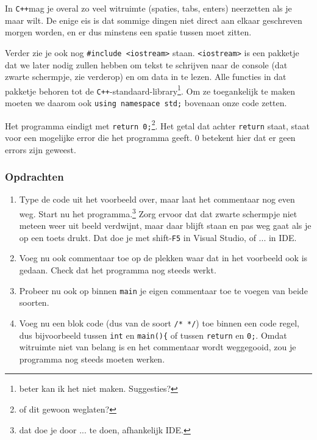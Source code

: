 \documentclass[12pt,a4paper]{article}
\newcommand{\icode}{\lstinline}
\newcommand{\mono}{\texttt}
\newcommand{\cpp}{\mono{C++}}
\begin{document}
In \cpp  mag je overal zo veel witruimte (spaties, tabs, enters) neerzetten als je maar wilt. De enige eis is dat sommige dingen niet direct aan elkaar geschreven morgen worden, en er dus minstens een spatie tussen moet zitten.


Verder zie je ook nog \icode{#include <iostream>} staan. \icode{<iostream>} is een pakketje dat we later nodig zullen hebben om tekst te schrijven naar de console (dat zwarte schermpje, zie verderop) en om data in te lezen. Alle functies in dat pakketje behoren tot de \cpp-standaard-library\footnote{beter kan ik het niet maken. Suggesties?}. Om ze toegankelijk te maken moeten we daarom ook \icode{using namespace std;} bovenaan onze code zetten.


Het programma eindigt met \icode{return 0;}\footnote{of dit gewoon weglaten?}. Het getal dat achter \icode{return} staat, staat voor een mogelijke error die het programma geeft. 0 betekent hier dat er geen errors zijn geweest.
\subsubsection{Opdrachten}
\begin{enumerate}
	\item
		Type de code uit het voorbeeld over, maar laat het commentaar nog even weg. Start nu het programma.\footnote{dat doe je door ... te doen, afhankelijk IDE.} Zorg ervoor dat dat zwarte schermpje niet meteen weer uit beeld verdwijnt, maar daar blijft staan en pas weg gaat als je op een toets drukt.
		Dat doe je met shift-\mono{F5} in Visual Studio, of ... in IDE.
	\item
		Voeg nu ook commentaar toe op de plekken waar dat in het voorbeeld ook is gedaan. Check dat het programma nog steeds werkt.
	\item
		Probeer nu ook op binnen \icode{main} je eigen commentaar toe te voegen van beide soorten.
	\item 
		Voeg nu een blok code (dus van de soort \icode{/* */}) toe binnen een code regel, dus bijvoorbeeld tussen \icode{int} en \icode{main(){} of tussen \icode{return} en \icode{0;}. Omdat witruimte niet van belang is en het commentaar wordt weggegooid, zou je programma nog steeds moeten werken.
\end{enumerate}
\end{document}
